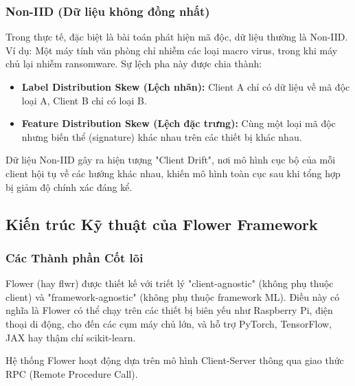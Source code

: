 \subsubsection{Non-IID (Dữ liệu không đồng nhất)}
Trong thực tế, đặc biệt là bài toán phát hiện mã độc, dữ liệu thường là Non-IID. Ví dụ: Một máy tính văn phòng chỉ nhiễm các loại macro virus, trong khi máy chủ lại nhiễm ransomware. Sự lệch pha này được chia thành:
\begin{itemize}
    \item \textbf{Label Distribution Skew (Lệch nhãn):} Client A chỉ có dữ liệu về mã độc loại A, Client B chỉ có loại B.
    \item \textbf{Feature Distribution Skew (Lệch đặc trưng):} Cùng một loại mã độc nhưng biến thể (signature) khác nhau trên các thiết bị khác nhau.
\end{itemize}
Dữ liệu Non-IID gây ra hiện tượng "Client Drift", nơi mô hình cục bộ của mỗi client hội tụ về các hướng khác nhau, khiến mô hình toàn cục sau khi tổng hợp bị giảm độ chính xác đáng kể.

\subsection{Kiến trúc Kỹ thuật của Flower Framework}

\subsubsection{Các Thành phần Cốt lõi}
Flower (hay flwr) được thiết kế với triết lý "client-agnostic" (không phụ thuộc client) và "framework-agnostic" (không phụ thuộc framework ML). Điều này có nghĩa là Flower có thể chạy trên các thiết bị biên yếu như Raspberry Pi, điện thoại di động, cho đến các cụm máy chủ lớn, và hỗ trợ PyTorch, TensorFlow, JAX hay thậm chí scikit-learn.

Hệ thống Flower hoạt động dựa trên mô hình Client-Server thông qua giao thức RPC (Remote Procedure Call).

